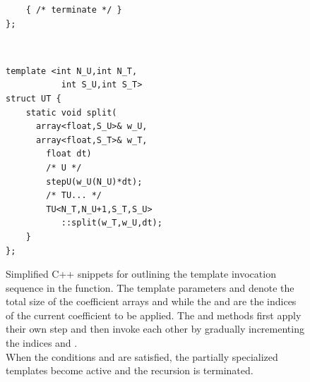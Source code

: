 \begin{figure}[ht]
\begin{minipage}[c]{\textwidth}
\begin{minipage}[r][10cm][t]{.4\textwidth}
\begin{minipage}[t]{\textwidth}
\begin{lstlisting}
	{ /* terminate */ }
};
\end{lstlisting}
			\end{minipage} \\
			\vspace{5mm}
			\begin{minipage}[t]{\textwidth}
\begin{lstlisting}
template <int N_U,int N_T,
           int S_U,int S_T>
struct UT {
	static void split(
	  array<float,S_U>& w_U,
	  array<float,S_T>& w_T,
		float dt)
		/* U */
		stepU(w_U(N_U)*dt);
		/* TU... */
		TU<N_T,N_U+1,S_T,S_U>
		   ::split(w_T,w_U,dt);
	}
};
\end{lstlisting}
			\end{minipage}
	\end{minipage}
	\end{minipage}
	\caption{Simplified C++ snippets for outlining the template invocation sequence in the  function. The template parameters  and  denote the total size of the coefficient arrays  and  while the  and  are the indices of the current coefficient to be applied. The  and  methods first apply their own step and then invoke each other by gradually incrementing the indices  and . \\
	When the conditions  and  are satisfied, the partially specialized templates become active and the recursion is terminated.}
	\label{fig:intsplit}
\end{figure}
